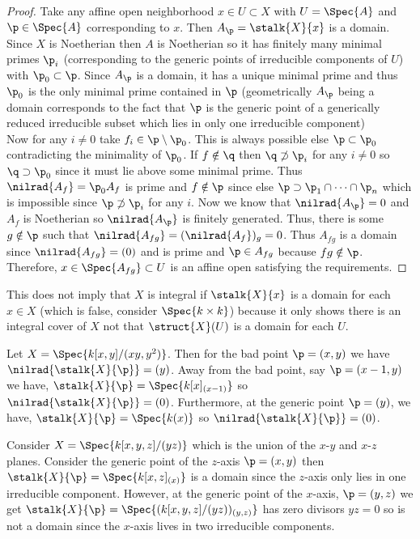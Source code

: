 \begin{proof}
Take any affine open neighborhood $x \in U \subset X$ with $U = \Spec{A}$ and $\p \in \Spec{A}$ corresponding to $x$. Then $A_\p = \stalk{X}{x}$ is a domain. Since $X$ is Noetherian then $A$ is Noetherian so it has finitely many minimal primes $\p_i$ (corresponding to the generic points of irreducible components of $U$) with $\p_0 \subset \p$. Since $A_\p$ is a domain, it has a unique minimal prime and thus $\p_0$ is the only minimal prime contained in $\p$ (geometrically $A_\p$ being a domain corresponds to the fact that $\p$ is the generic point of a generically reduced irreducible subset which lies in only one irreducible component)
\bigskip\\
Now for any $i \neq 0$ take $f_i \in \p \setminus \p_0$. This is always possible else $\p \subset \p_0$ contradicting the minimality of $\p_0$. If $f \notin \q$ then $\q \not\supset \p_i$ for any $i \neq 0$ so $\q \supset \p_0$ since it must lie above some minimal prime. Thus $\nilrad{A_f} = \p_0 A_f$ is prime and $f \notin \p$ since else $\p \supset \p_1 \cap \cdots \cap \p_n$ which is impossible since $\p \not\supset \p_i$ for any $i$. Now we know that $\nilrad{A_\p} = 0$ and $A_f$ is Noetherian so $\nilrad{A_\p}$ is finitely generated. Thus, there is some $g \notin \p$ such that $\nilrad{A_{fg}} = (\nilrad{A_f})_g = 0$. Thus $A_{fg}$ is a domain since $\nilrad{A_{fg}} = (0)$ and is prime and $\p \in A_{fg}$ because $fg \notin \p$. Therefore, $x \in \Spec{A_{fg}} \subset U$ is an affine open satisfying the requirements. 
\end{proof}

\begin{rmk}
This does not imply that $X$ is integral if $\stalk{X}{x}$ is a domain for each $x \in X$ (which is false, consider $\Spec{k \times k}$) because it only shows there is an integral cover of $X$ not that $\struct{X}(U)$ is a domain for each $U$. 
\end{rmk}

\begin{example}
Let $X = \Spec{k[x,y]/(xy, y^2)}$. Then for the bad point $\p = (x, y)$ we have $\nilrad{\stalk{X}{\p}} = (y)$. Away from the bad point, say $\p = (x - 1, y)$ we have, $\stalk{X}{\p} = \Spec{k[x]_{(x-1)}}$ so $\nilrad{\stalk{X}{\p}} = (0)$. Furthermore, at the generic point $\p = (y)$, we have, $\stalk{X}{\p} = \Spec{k(x)}$ so $\nilrad{\stalk{X}{\p}} = (0)$. 
\end{example}

\begin{example}
 Consider $X = \Spec{k[x,y,z]/(yz)}$ which is the union of the $x$-$y$ and $x$-$z$ planes. Consider the generic point of the $z$-axis $\p = (x, y)$ then $\stalk{X}{\p} = \Spec{k[x, z]_{(x)}}$ is a domain since the $z$-axis only lies in one irreducible component. However, at the generic point of the $x$-axis, $\p = (y, z)$ we get $\stalk{X}{\p} = \Spec{(k[x, y, z]/(yz))_{(y, z)}}$ has zero divisors $yz = 0$ so is not a domain since the $x$-axis lives in two irreducible components.
\end{example}

